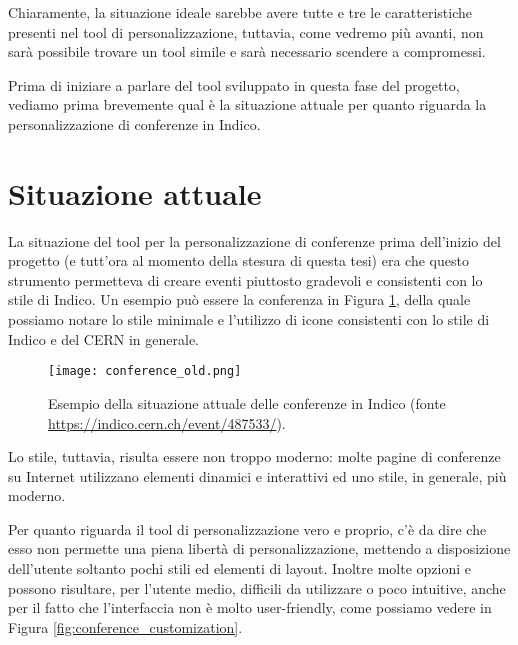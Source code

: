     Chiaramente, la situazione ideale sarebbe avere tutte e tre le caratteristiche presenti nel tool di personalizzazione, tuttavia, come vedremo più avanti, non sarà possibile trovare un tool simile e sarà necessario scendere a compromessi.
    
    Prima di iniziare a parlare del tool sviluppato in questa fase del progetto, vediamo prima brevemente qual è la situazione attuale per quanto riguarda la personalizzazione di conferenze in Indico.
    
    \section{Situazione attuale} \label{sec:ccp;situazione_attuale}
    
        La situazione del tool per la personalizzazione di conferenze prima dell'inizio del progetto (e tutt'ora al momento della stesura di questa tesi) era che questo strumento permetteva di creare eventi piuttosto gradevoli e consistenti con lo stile di Indico. Un esempio può essere la conferenza in Figura \ref{fig:conference_old}, della quale possiamo notare lo stile minimale e l'utilizzo di icone consistenti con lo stile di Indico e del \ac{CERN} in generale.
        
        \begin{figure}[h!]
            \begin{center}
        		\texttt{[image: conference\_old.png]}
        	\end{center}
            \caption[Esempio di conferenza in Indico]{Esempio della situazione attuale delle conferenze in Indico (fonte \url{https://indico.cern.ch/event/487533/}).}
            \label{fig:conference_old}
        \end{figure}
        
        Lo stile, tuttavia, risulta essere non troppo moderno: molte pagine di conferenze su Internet utilizzano elementi dinamici e interattivi ed uno stile, in generale, più moderno.
        
        Per quanto riguarda il tool di personalizzazione vero e proprio, c'è da dire che esso non permette una piena libertà di personalizzazione, mettendo a disposizione dell'utente soltanto pochi stili ed elementi di layout. Inoltre molte opzioni e possono risultare, per l'utente medio, difficili da utilizzare o poco intuitive, anche per il fatto che l'interfaccia non è molto user-friendly, come possiamo vedere in Figura \ref{fig:conference_customization}.
        
